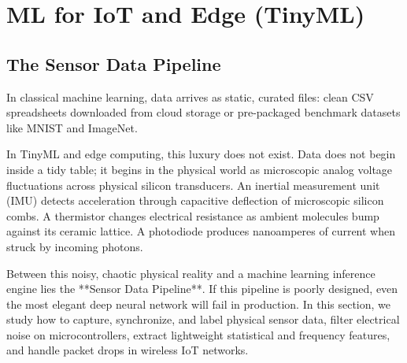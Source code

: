 \chapter{ML for IoT and Edge (TinyML)}\label{ch:tinyml}
\section{The Sensor Data Pipeline}\label{sec:sensor_pipeline}

In classical machine learning, data arrives as static, curated files: clean CSV spreadsheets downloaded from cloud storage or pre-packaged benchmark datasets like MNIST and ImageNet. 

In TinyML and edge computing, this luxury does not exist. Data does not begin inside a tidy table; it begins in the physical world as microscopic analog voltage fluctuations across physical silicon transducers. An inertial measurement unit (IMU) detects acceleration through capacitive deflection of microscopic silicon combs. A thermistor changes electrical resistance as ambient molecules bump against its ceramic lattice. A photodiode produces nanoamperes of current when struck by incoming photons.

Between this noisy, chaotic physical reality and a machine learning inference engine lies the **Sensor Data Pipeline**. If this pipeline is poorly designed, even the most elegant deep neural network will fail in production. In this section, we study how to capture, synchronize, and label physical sensor data, filter electrical noise on microcontrollers, extract lightweight statistical and frequency features, and handle packet drops in wireless IoT networks.

